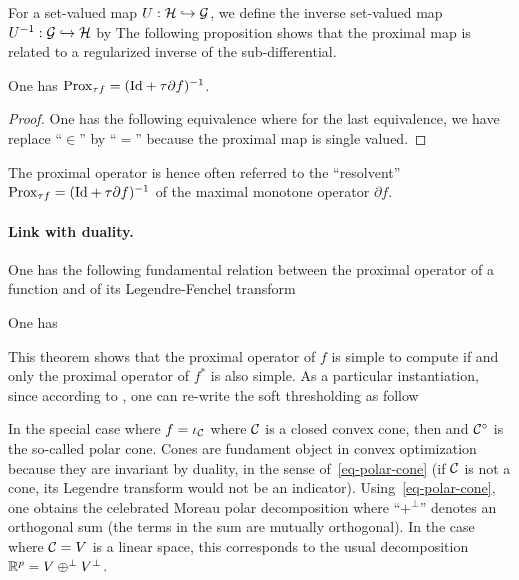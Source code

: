 For a set-valued map $U : \mathcal{H} \hookrightarrow \mathcal{G}$, we define the inverse set-valued map $U^{-1} : \mathcal{G} \hookrightarrow \mathcal{H}$ by 
The following proposition shows that the proximal map is related to a regularized inverse of the sub-differential.


\begin{prop}
	One has $\operatorname{Prox}_{\tau f} = (\mathrm{Id}+\tau\partial f)^{-1}$.
\end{prop}
\begin{proof}
One has the following equivalence
where for the last equivalence, we have replace ``$\in$'' by ``$=$'' because the proximal map is single valued.
\end{proof}

The proximal operator is hence often referred to the ``resolvent'' $\operatorname{Prox}_{\tau f} = (\mathrm{Id}+\tau\partial f)^{-1}$ of the maximal monotone operator $\partial f$. 

\paragraph{Link with duality.}

One has the following fundamental relation between the proximal operator of a function and of its Legendre-Fenchel transform

\begin{thm}
	One has
\end{thm}

This theorem shows that the proximal operator of $f$ is simple to compute if and only the proximal operator of $f^*$ is also simple. 
%
As a particular instantiation, since according to , one can re-write the soft thresholding as follow

In the special case where $f=\iota_{\mathcal{C}}$ where $\mathcal{C}$ is a closed convex cone, then
and $\mathcal{C}^\circ$ is the so-called polar cone. Cones are fundament object in convex optimization because they are invariant by duality, in the sense of~\eqref{eq-polar-cone} (if $\mathcal{C}$ is not a cone, its Legendre transform would not be an indicator).
%
Using~\eqref{eq-polar-cone}, one obtains the celebrated Moreau polar decomposition
where ``$+^\bot$'' denotes an orthogonal sum (the terms in the sum are mutually orthogonal). 
%
In the case where $\mathcal{C}=V$ is a linear space, this corresponds to the usual decomposition $\mathbb{R}^p = V \oplus^\bot V^\bot$. 

